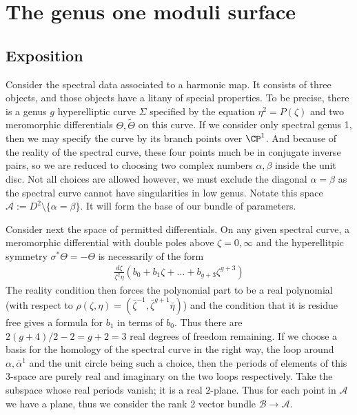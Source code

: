 \chapter{The genus one moduli surface}
\section{Exposition}
Consider the spectral data associated to a harmonic map. It consists of three objects, and those objects have a litany of special properties. To be precise, there is a genus $g$ hyperelliptic curve $Σ$ specified by the equation $η^2=P(ζ)$ and two meromorphic differentials $Θ, \tilde{Θ}$ on this curve. If we consider only spectral genus 1, then we may specify the curve by its branch points over $\CP^1$. And because of the reality of the spectral curve, these four points much be in conjugate inverse pairs, so we are reduced to choosing two complex numbers $α,β$ inside the unit disc. Not all choices are allowed however, we must exclude the diagonal $α=β$ as the spectral curve cannot have singularities in low genus. Notate this space $\mathcal{A} := D^2 \setminus \{α=β\}$. It will form the base of our bundle of parameters.

Consider next the space of permitted differentials. On any given spectral curve, a meromorphic differential with double poles above $ζ=0,\infty$ and the hyperellitpic symmetry $σ^* Θ = - Θ$ is necessarily of the form
\begin{align}
\frac{dζ}{ζ^2η}\left( b_0 + b_1ζ + \ldots + b_{g+3}ζ^{g+3} \right)
\end{align}
The reality condition then forces the polynomial part to be a real polynomial (with respect to $ρ(ζ,η) = (\bar{ζ}^{-1}, \bar{ζ}^{g+1}\bar{η})$) and the condition that it is residue free gives a formula for $b_1$ in terms of $b_0$. Thus there are $2(g+4)/2-2 = g+2=3$ real degrees of freedom remaining. If we choose a basis for the homology of the spectral curve in the right way, the loop around $α,\bar{α}^1$ and the unit circle being such a choice, then the periods of elements of this $3$-space are purely real and imaginary on the two loops respectively. Take the subspace whose real periods vanish; it is a real $2$-plane. Thus for each point in $\mathcal{A}$ we have a plane, thus we consider the rank 2 vector bundle $\mathcal{B}\to\mathcal{A}$.

